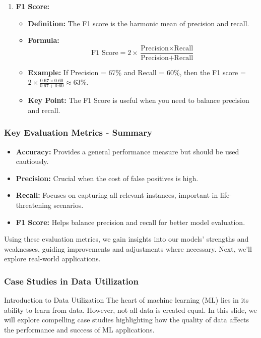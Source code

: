 \documentclass[aspectratio=169]{beamer}
\begin{document}
\begin{frame}[fragile]
\begin{enumerate}
        \item \textbf{F1 Score:}
        \begin{itemize}
            \item \textbf{Definition:} The F1 score is the harmonic mean of precision and recall.
            \item \textbf{Formula:}  
            \begin{equation}
                \text{F1 Score} = 2 \times \frac{\text{Precision} \times \text{Recall}}{\text{Precision} + \text{Recall}}
            \end{equation}
            \item \textbf{Example:} If Precision = 67\% and Recall = 60\%, then the F1 score = \( 2 \times \frac{0.67 \times 0.60}{0.67 + 0.60} \approx 63\%\).
            \item \textbf{Key Point:} The F1 Score is useful when you need to balance precision and recall.
        \end{itemize}
    \end{enumerate}
\end{frame}

\begin{frame}[fragile]
    \frametitle{Key Evaluation Metrics - Summary}
    \begin{itemize}
        \item \textbf{Accuracy:} Provides a general performance measure but should be used cautiously.
        \item \textbf{Precision:} Crucial when the cost of false positives is high.
        \item \textbf{Recall:} Focuses on capturing all relevant instances, important in life-threatening scenarios.
        \item \textbf{F1 Score:} Helps balance precision and recall for better model evaluation.
    \end{itemize}

    Using these evaluation metrics, we gain insights into our models' strengths and weaknesses, guiding improvements and adjustments where necessary. Next, we’ll explore real-world applications.
\end{frame}

\begin{frame}[fragile]
    \frametitle{Case Studies in Data Utilization}
    \begin{block}{Introduction to Data Utilization}
        The heart of machine learning (ML) lies in its ability to learn from data. However, not all data is created equal. In this slide, we will explore compelling case studies highlighting how the quality of data affects the performance and success of ML applications.
    \end{block}
\end{frame}
\end{document}

